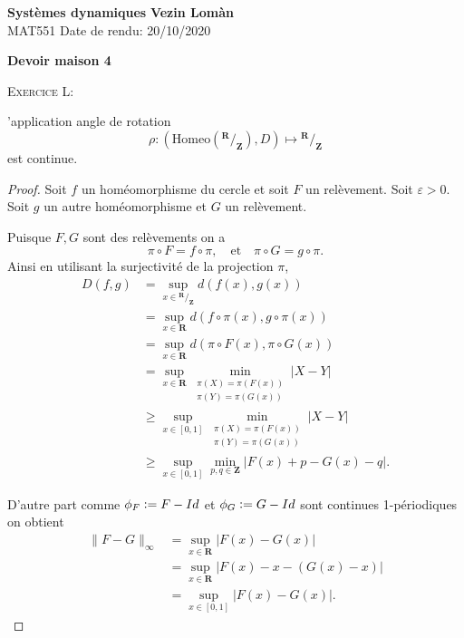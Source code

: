 \documentclass[12pt]{article}
\newcommand{\defeq}{\vcentcolon=}
\newenvironment{ex}[1]
{\begin{mdframed}[linewidth=0.6pt]
        \textsc{Exercice #1:}

}
    {\end{mdframed}}
\newcommand{\R}{\mathbf{R}}
\newcommand{\Z}{\mathbf{Z}}
\newcommand*\quot[2]{{^{\textstyle #1}\big/_{\textstyle #2}}}
\theoremstyle{remark}
\begin{document}
        \noindent
\textbf{Systèmes dynamiques} \hfill \textbf{Vezin Lomàn}\\
\normalsize MAT551 \hfill Date de rendu: 20/10/2020\\

\begin{center}
\textbf{Devoir maison 4}
\end{center}
        
\begin{ex}{1}
        L'application angle de rotation \[
        \rho : (\mathrm{Homeo}(\quot{\R}{\Z}), D) \longmapsto \quot{\R}{\Z}
        \] est continue.
\end{ex}
\begin{proof}
        Soit $f$ un homéomorphisme du cercle et soit $F$ un relèvement. Soit $\varepsilon > 0$. Soit $g$ un autre homéomorphisme et $G$ un relèvement.

        Puisque $F, G$ sont des relèvements on a  \[
        \pi\circ F = f \circ\pi, \quad \text{et} \quad \pi\circ G = g \circ\pi
        .\] Ainsi en utilisant la surjectivité de la projection $\pi$,
        \begin{align*}
                D(f,g) &= \sup_{x\in\quot{\R}{\Z}}d(f(x), g(x)) \\
                       &= \sup_{x \in \R}d(f\circ\pi(x), g\circ\pi(x)) \\
                       &= \sup_{x\in \R}d(\pi\circ F(x),\pi\circ G(x)) \\
                       &= \sup_{x \in \R}\min_{\substack{\pi(X) = \pi(F(x)) \\ \pi(Y) = \pi(G(x))}}|X-Y| \\
                       &\ge \sup_{x \in [0,1]}\min_{\substack{\pi(X) = \pi(F(x)) \\ \pi(Y) = \pi(G(x))}}|X-Y| \\
                       &\ge \sup_{x \in [0,1]}\min_{p, q \in \Z}|F(x)+p-G(x)-q|
        .\end{align*}

        D'autre part comme $\phi_{F} \defeq F-Id$ et $\phi_{G} \defeq G-Id$ sont continues 1-périodiques on obtient
        \begin{align*}
                \|F-G\|_{\infty} &= \sup_{x\in\R}|F(x)-G(x)| \\
                                 &= \sup_{x\in\R}|F(x)-x-(G(x)-x)| \\
                                 &= \sup_{x\in [0,1]}|F(x)-G(x)| 
        .\end{align*}


\end{proof}
\end{document}
